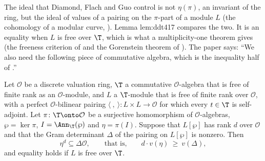 \begin{remark}\label{rem:congruence:why-a-module}
The ideal that Diamond, Flach and Guo control is not $\eta(\pi)$, an invariant of the ring, but the ideal of values of a pairing on the $\pi$-part of a module $L$ (the
cohomology of a modular curve, ). Lemma lem:ddt417 compares the two. It is an equality when $L$ is free over $\T$, which is what a
multiplicity-one theorem gives (the freeness criterion of  and the Gorenstein theorem of ). The paper says: ``We also need the following piece of
commutative algebra, which is the inequality half of \cite[Lemma 4.17]{DDT}.''
\end{remark}

\begin{lemma}\label{lem:congruence:ddt417}
Let $\mathcal O$ be a discrete valuation ring, $\T$ a commutative $\mathcal O$-algebra that is free of finite rank as an $\mathcal O$-module, and $L$ a $\T$-module that is free of finite rank over $\mathcal O$,
with a perfect $\mathcal O$-bilinear pairing $\langle\ ,\ \rangle\colon L\times L\to\mathcal O$ for which every $t\in\T$ is self-adjoint. Let $\pi\colon\T\onto\mathcal O$ be a surjective homomorphism of $\mathcal O$-algebras,
$\wp=\ker\pi$, $I=\Ann_\T(\wp)$ and $\eta=\pi(I)$. Suppose that $L[\wp]$ has rank $d$ over $\mathcal O$ and that the Gram determinant $\Delta$ of the pairing on $L[\wp]$ is nonzero. Then
\[
\eta^d\subseteq\Delta\mathcal O,\qquad\text{that is,}\qquad d\cdot v(\eta)\ \ge\ v(\Delta),
\]
and equality holds if $L$ is free over $\T$.
\end{lemma}

